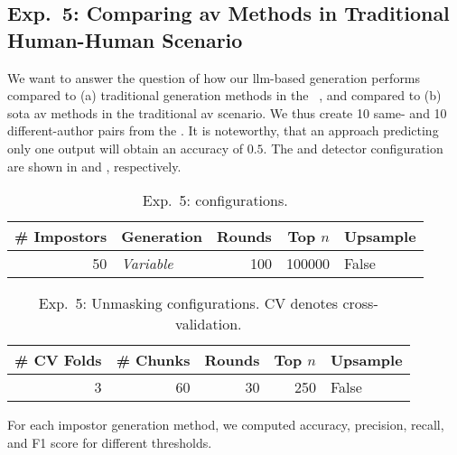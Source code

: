 \subsection{Exp.\ 5: Comparing \acs{av} Methods in Traditional Human-Human Scenario}
\label{subsec:imp_gen}

We want to answer the question of how our \ac{llm}-based \imp{} generation performs compared to (a) traditional \imp{} generation methods in the \impAppr{}~\citep{koppel_determining_2014}, and compared to (b) \acl{sota} \ac{av} methods in the traditional \ac{av} scenario.
We thus create 10 same- and 10 different-author pairs from the \dataStudent{}. %
It is noteworthy, that an approach predicting only one output will obtain an accuracy of $0.5$.
The \impAppr{} and \unmasking{} detector configuration are shown in  and , respectively.

\begin{table}[h]
\centering\small
\caption{Exp.\ 5: \impAppr{} configurations.}
\label{tab:exp5_imp_config}
\begin{tabular}{@{}rlrrl@{}}   %
\toprule
\# Impostors & Generation & Rounds & Top $n$ & Upsample \\
\midrule
50 & \textit{Variable} & 100 & \num{100000} & False \\
\bottomrule
\end{tabular}%
\end{table}

\begin{table}[h]
\centering\small
\caption[Exp.\ 5: Unmasking configurations.]{Exp.\ 5: Unmasking configurations. CV denotes cross-validation.}
\label{tab:exp5_unmasking_config}
\begin{tabular}{@{}rrrrl@{}}   %
\toprule
\# CV Folds & \# Chunks & Rounds & Top $n$ & Upsample \\
\midrule
3 & 60 & 30 & \num{250} & False \\
\bottomrule
\end{tabular}%
\end{table}

For each impostor generation method, we computed accuracy, precision, recall, and F1 score for different thresholds. 
